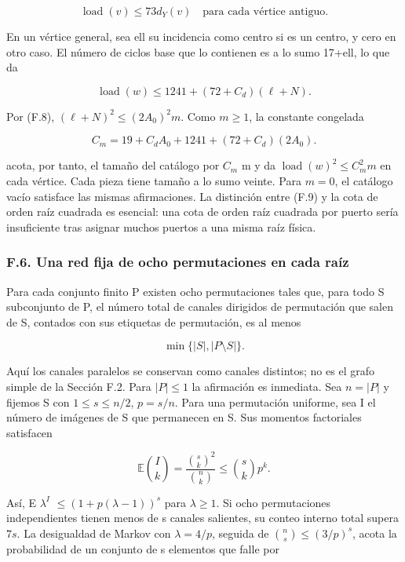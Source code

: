 \documentclass[spanish,11pt,a4paper]{article}
\begin{document}
\[\operatorname{load}(v)\le73d_Y(v)\quad\text{para cada vértice antiguo}.\tag{F.9}\]

En un vértice general, sea ell su incidencia como centro si es un centro, y cero en otro caso. El número de ciclos base que lo contienen es a lo sumo 17+ell, lo que da

\[\operatorname{load}(w)\le1241+(72+C_d)(\ell+N).\]

Por (F.8), \((\ell+N)^2\le(2A_0)^2m\). Como \(m\ge 1\), la constante congelada

\[C_m=19+C_dA_0+1241+(72+C_d)(2A_0).\tag{F.10}\]

acota, por tanto, el tamaño del catálogo por \(C_{m}\) m y da \(\operatorname{load}(w)^2\le C_m^2m\) en cada vértice. Cada pieza tiene tamaño a lo sumo veinte. Para \(m=0\), el catálogo vacío satisface las mismas afirmaciones. La distinción entre (F.9) y la cota de orden raíz cuadrada es esencial: una cota de orden raíz cuadrada por puerto sería insuficiente tras asignar muchos puertos a una misma raíz física.

\subsubsection{F.6. Una red fija de ocho permutaciones en cada raíz}\label{f.6.-una-red-fija-de-ocho-permutaciones-en-cada-rauxedz}

Para cada conjunto finito P existen ocho permutaciones tales que, para todo S subconjunto de P, el número total de canales dirigidos de permutación que salen de S, contados con sus etiquetas de permutación, es al menos

\[\min\{|S|,|P\setminus S|\}.\tag{F.11}\]

Aquí los canales paralelos se conservan como canales distintos; no es el grafo simple de la Sección F.2. Para \(|P|\le 1\) la afirmación es inmediata. Sea \(n=|P|\) y fijemos S con \(1\le s\le n/2\), \(p=s/n\). Para una permutación uniforme, sea I el número de imágenes de S que permanecen en S. Sus momentos factoriales satisfacen

\[\mathbb E\binom Ik=\frac{\binom sk^2}{\binom nk}\le\binom skp^k.\]

Así, E \(\lambda^{I}\) \(\le (1+p(\lambda-1))^{s}\) para \(\lambda\ge 1\). Si ocho permutaciones independientes tienen menos de s canales salientes, su conteo interno total supera \(7s\). La desigualdad de Markov con \(\lambda=4/p\), seguida de \(\binom{n}{s}\le (3/p)^{s}\), acota la probabilidad de un conjunto de s elementos que falle por
\end{document}
